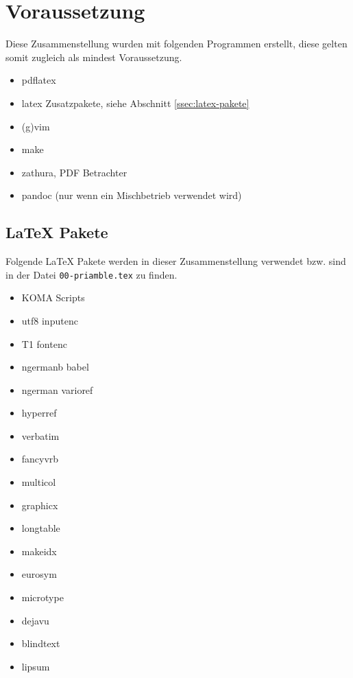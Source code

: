 \section{Voraussetzung}
\label{sec:voraussetzung}

Diese Zusammenstellung wurden mit folgenden Programmen erstellt,
diese gelten somit zugleich als mindest Voraussetzung.

\begin{itemize}
	\item pdflatex
	\item latex Zusatzpakete, siehe Abschnitt \vref{ssec:latex-pakete}
	\item (g)vim
	\item make
	\item zathura, PDF Betrachter
	\item pandoc (nur wenn ein Mischbetrieb verwendet wird)
\end{itemize}



\subsection{\LaTeX{} Pakete}
\label{ssec:latex-pakete}

Folgende \LaTeX{} Pakete werden in dieser Zusammenstellung verwendet
bzw. sind in der Datei \texttt{00-priamble.tex} zu finden.

\todo

\begin{itemize}
	\item KOMA Scripts
	\item utf8 inputenc
	\item T1 fontenc
	\item ngermanb babel
	\item ngerman varioref 
	\item hyperref
	\item verbatim
	\item fancyvrb
	\item multicol
	\item graphicx
	\item longtable
	\item makeidx
	\item eurosym
	\item microtype
	\item dejavu
	\item blindtext
	\item lipsum
\end{itemize}




